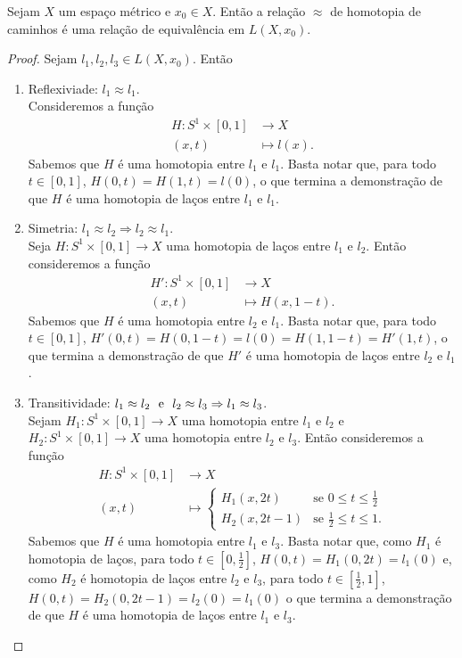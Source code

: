 \begin{prop}
	Sejam $X$ um espaço métrico e $x_0 \in X$. Então a relação $\approx$ de homotopia de caminhos é uma relação de equivalência em $L(X,x_0)$.
\end{prop}
\begin{proof} Sejam $l_1,l_2,l_3 \in L(X,x_0)$. Então
	\begin{enumerate}
	\item Reflexiviade: $l_1 \approx l_1$. \\
	Consideremos a função
		\begin{align*}
		H: S^1 \times [0,1] &\to X \\
		(x,t) &\mapsto l(x).
		\end{align*}
Sabemos que $H$ é uma homotopia entre $l_1$ e $l_1$. Basta notar que, para todo $t \in [0,1]$, $H(0,t)=H(1,t)=l(0)$, o que termina a demonstração de que $H$ é uma homotopia de laços entre $l_1$ e $l_1$.
	
	\item Simetria: $l_1 \approx l_2 \Rightarrow l_2 \approx l_1$. \\
	Seja $H: S^1 \times [0,1] \to X$ uma homotopia de laços entre $l_1$ e $l_2$. Então consideremos a função
	\begin{align*}
	H': S^1 \times [0,1] &\to X \\
		(x,t) &\mapsto H(x,1-t).
	\end{align*}		
Sabemos que $H$ é uma homotopia entre $l_2$ e $l_1$. Basta notar que, para todo $t \in [0,1]$, $H'(0,t)=H(0,1-t)=l(0)=H(1,1-t)=H'(1,t)$, o que termina a demonstração de que $H'$ é uma homotopia de laços entre $l_2$ e $l_1$.

	\item Transitividade: $l_1 \approx l_2 \text{\ \ e\ \ } l_2 \approx l_3 \Rightarrow l_1 \approx l_3$. \\
	Sejam $H_1: S^1 \times [0,1] \to X$ uma homotopia entre $l_1$ e $l_2$ e $H_2: S^1 \times [0,1] \to X$ uma homotopia entre $l_2$ e $l_3$. Então consideremos a função
	\begin{align*}
	H: S^1 \times [0,1] &\to X \\
		(x,t) &\mapsto \begin{cases}
						H_1(x,2t) &\text{se $0 \leq t \leq \frac{1}{2}$}\\
						H_2(x,2t-1) &\text{se $\frac{1}{2} \leq t \leq 1$}.
						\end{cases}
	\end{align*}
Sabemos que $H$ é uma homotopia entre $l_1$ e $l_3$. Basta notar que, como $H_1$ é homotopia de laços, para todo $t \in [0,\frac{1}{2}]$, $H(0,t)=H_1(0,2t)=l_1(0)$ e, como $H_2$ é homotopia de laços entre $l_2$ e $l_3$, para todo $t \in [\frac{1}{2},1]$, $H(0,t)=H_2(0,2t-1)=l_2(0)=l_1(0)$ o que termina a demonstração de que $H$ é uma homotopia de laços entre $l_1$ e $l_3$. 
	\end{enumerate}
\end{proof}

